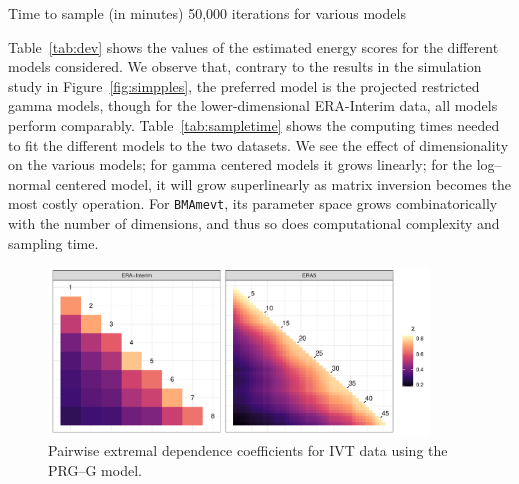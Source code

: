 \begin{table}[htb]
  \centering
  \caption{Time to sample (in minutes) 50,000 iterations for various models\label{tab:sampletime}}
  
\end{table}

Table~\ref{tab:dev} shows the values of the estimated energy 
    scores for the different models considered. We observe that, contrary to the results in the
    simulation study in Figure~\ref{fig:simpples}, the preferred model is the projected restricted 
    gamma models, though for the lower-dimensional ERA-Interim data, all models perform comparably.
    Table~\ref{tab:sampletime} shows the computing times needed to fit the different models to the
    two datasets.  We see the effect of dimensionality on the various models; for gamma centered
    models it grows linearly; for the log--normal centered model, it will grow superlinearly as matrix
    inversion becomes the most costly operation.  For \verb|BMAmevt|, its parameter space grows
    combinatorically with the number of dimensions, and thus so does computational complexity and
    sampling time.

\begin{figure}[htb]
    \centering
    \caption{Pairwise extremal dependence coefficients for IVT data using the PRG--G model.\label{fig:chi_ij}}
    \includegraphics[width=0.9\textwidth]{./images/chi_ij_c}
\end{figure}

